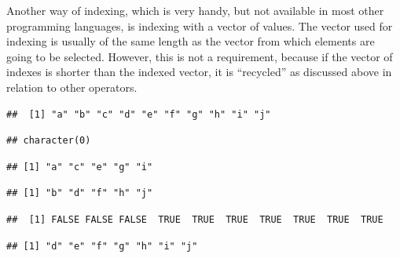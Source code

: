 \documentclass[krantz2]{krantz}\usepackage{knitr}
\begin{document}
Another way of indexing, which is very handy, but not available in most other programming languages, is indexing with a vector of  values. The  vector used for indexing is usually of the same length as the vector from which elements are going to be selected. However, this is not a requirement, because if the  vector of indexes is shorter than the indexed vector, it is ``recycled'' as discussed above in relation to other operators.

\begin{knitrout}\footnotesize
{}\color{fgcolor}\begin{kframe}
\begin{alltt}
\hlstd{a[}\hlstd{]}
\end{alltt}
\begin{verbatim}
##  [1] "a" "b" "c" "d" "e" "f" "g" "h" "i" "j"
\end{verbatim}
\begin{alltt}
\hlstd{a[}\hlstd{]}
\end{alltt}
\begin{verbatim}
## character(0)
\end{verbatim}
\begin{alltt}
\hlstd{a[}\hlstd{(}\hlstd{,} \hlstd{)]}
\end{alltt}
\begin{verbatim}
## [1] "a" "c" "e" "g" "i"
\end{verbatim}
\begin{alltt}
\hlstd{a[}\hlstd{(}\hlstd{,} \hlstd{)]}
\end{alltt}
\begin{verbatim}
## [1] "b" "d" "f" "h" "j"
\end{verbatim}
\begin{alltt}
 \hlopt{>} 
\end{alltt}
\begin{verbatim}
##  [1] FALSE FALSE FALSE  TRUE  TRUE  TRUE  TRUE  TRUE  TRUE  TRUE
\end{verbatim}
\begin{alltt}
\hlstd{a[a} \hlopt{>} \hlstd{]}
\end{alltt}
\begin{verbatim}
## [1] "d" "e" "f" "g" "h" "i" "j"
\end{verbatim}
\end{kframe}
\end{knitrout}
\end{document}
